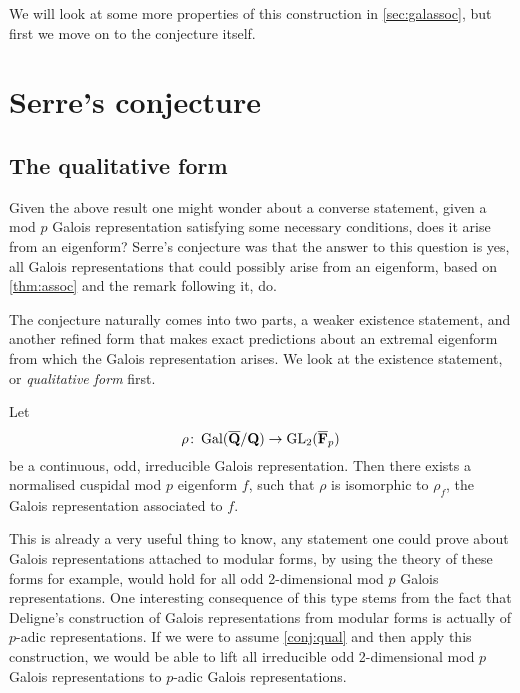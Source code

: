 \documentclass[a4paper,12pt]{article}
\begin{document}
We will look at some more properties of this construction in \cref{sec:galassoc}, but first we move on to the conjecture itself.


\section{Serre's conjecture}
\subsection{The qualitative form}
Given the above result one might wonder about a converse statement, given a mod $p$ Galois representation satisfying some necessary conditions, does it arise from an eigenform?
Serre's conjecture was that the answer to this question is yes, all Galois representations that could possibly arise from an eigenform, based on \cref{thm:assoc} and the remark following it, do.

The conjecture naturally comes into two parts, a weaker existence statement, and another refined form that makes exact predictions about an extremal eigenform from which the Galois representation arises.
We look at the existence statement, or \emph{qualitative form} first.

\begin{conjecture}\label{conj:qual}
Let
\[
\rho\colon \operatorname{Gal}(\overline{\mathbf{Q}}/\mathbf{Q}) \to \operatorname{GL}_2(\overline{\mathbf{F}}_p)
\]
be a continuous, odd, irreducible Galois representation.
Then there exists a normalised cuspidal mod $p$ eigenform $f$, such that $\rho$ is isomorphic to $\rho_f$, the Galois representation associated to $f$.
\end{conjecture}

This is already a very useful thing to know, any statement one could prove about Galois representations attached to  modular forms, by using the theory of these forms for example, would hold for all odd 2-dimensional mod $p$ Galois representations. %
One interesting consequence of this type stems from the fact that Deligne's construction of Galois representations from modular forms is actually of $p$-adic representations.
If we were to assume \cref{conj:qual} and then apply this construction, we would be able to lift all irreducible odd 2-dimensional mod $p$ Galois representations to $p$-adic Galois representations.
\end{document}
